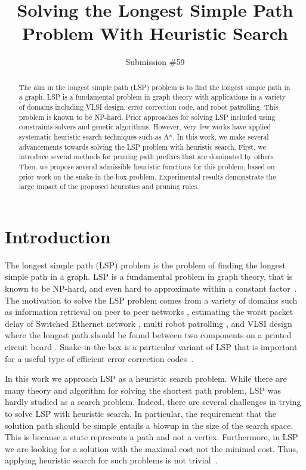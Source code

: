 \documentclass[letterpaper]{article} %
\title{Solving the Longest Simple Path Problem With Heuristic Search}
\author{Submission \#59}
\begin{document}
\maketitle

\begin{abstract}
The aim in the longest simple path (LSP) problem  is to find the longest simple path in a graph. LSP is a fundamental problem in graph theory with applications in a variety of domains including VLSI design, error correction code, and robot patrolling. This problem is known to be NP-hard. Prior approaches for solving LSP included using constraints solvers and genetic algorithms. However, very few works have applied systematic heuristic search techniques such as A*. In this work, we make several advancements towards solving the LSP problem with heuristic search.  First, we introduce several methods for pruning path prefixes that are dominated by others. Then, we propose several admissible heuristic functions for this problem, based on prior work on the snake-in-the-box problem. Experimental results demonstrate the large impact of the proposed heuristics and pruning rules. 
\end{abstract}
\section{Introduction}

The longest simple path (LSP) problem is the problem of finding the longest simple path in a graph. 
LSP is a fundamental problem in graph theory, that is known to be NP-hard, and even hard to approximate within a constant factor~\cite{karger1997approximating}. The motivation to solve the LSP problem comes from a variety of domains such as information retrieval on peer to peer networks \cite{Wong:2005:IRP:1062745.1062799}, estimating the worst packet delay of Switched Ethernet network \cite{DBLP:conf/sies/SchmidtS10}, multi robot patrolling \cite{Portugal:2010:MAM:1774088.1774360}, and VLSI design where the longest path should be found between two components on a printed circuit board \cite{chen2016vlsi}. Snake-in-the-box is a particular variant of LSP that is important for a useful type of efficient error correction codes~\cite{Kautz:1958:UDE}. 




In this work we approach LSP as a heuristic search problem. 
While there are many theory and algorithm for solving the shortest path problem, LSP was hardly studied as a search problem. 
Indeed, there are several challenges in trying to solve LSP with heuristic search. In particular, the requirement that the solution path should be simple entails a blowup in the size of the search space. This is because a state represents a path and not a vertex.
Furthermore, in LSP we are looking for a solution with the maximal cost not the minimal cost. Thus, applying heuristic search for such problems is not trivial~\cite{DBLP:conf/socs/SternKPFR14}.
\end{document}
